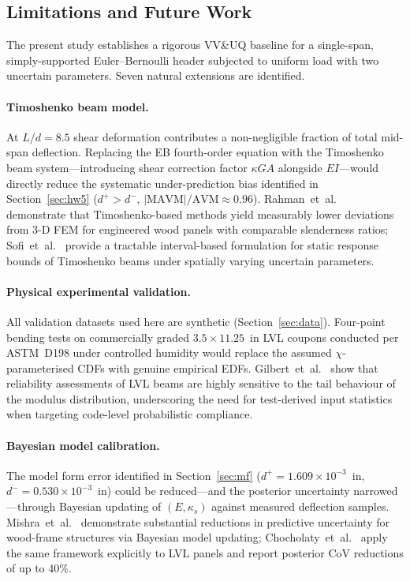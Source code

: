 \documentclass[10pt,twocolumn]{article}
\begin{document}
\subsection{Limitations and Future Work}
\label{sec:future}

The present study establishes a rigorous VV\&UQ baseline for a
single-span, simply-supported Euler--Bernoulli header subjected to
uniform load with two uncertain parameters.
Seven natural extensions are identified.

\paragraph{Timoshenko beam model.}
At $L/d = 8.5$ shear deformation contributes a non-negligible fraction
of total mid-span deflection.
Replacing the EB fourth-order equation with the Timoshenko beam
system---introducing shear correction factor $\kappa GA$ alongside
$EI$---would directly reduce the systematic under-prediction bias
identified in Section~\ref{sec:hw5} ($d^+ > d^-$,
$|\mathrm{MAVM}|/\mathrm{AVM} \approx 0.96$).
Rahman~et~al.~\cite{rahman2020} demonstrate that Timoshenko-based
methods yield measurably lower deviations from 3-D FEM for engineered
wood panels with comparable slenderness ratios; Sofi~et~al.~\cite{sofi2015}
provide a tractable interval-based formulation for static response
bounds of Timoshenko beams under spatially varying uncertain parameters.

\paragraph{Physical experimental validation.}
All validation datasets used here are synthetic
(Section~\ref{sec:data}).
Four-point bending tests on commercially graded
$3.5 \times 11.25$~in LVL coupons conducted per ASTM~D198 under
controlled humidity would replace the assumed $\chi$-parameterised CDFs
with genuine empirical EDFs.
Gilbert~et~al.~\cite{gilbert2019} show that reliability assessments of
LVL beams are highly sensitive to the tail behaviour of the modulus
distribution, underscoring the need for test-derived input statistics
when targeting code-level probabilistic compliance.

\paragraph{Bayesian model calibration.}
The model form error identified in Section~\ref{sec:mf}
($d^+ = 1.609\times10^{-3}$~in, $d^- = 0.530\times10^{-3}$~in)
could be reduced---and the posterior uncertainty narrowed---through
Bayesian updating of $(E, \kappa_s)$ against measured deflection
samples.
Mishra~et~al.~\cite{mishra2017} demonstrate substantial reductions in
predictive uncertainty for wood-frame structures via Bayesian model
updating; Chocholaty~et~al.~\cite{chocholaty2023} apply the same
framework explicitly to LVL panels and report posterior CoV
reductions of up to 40\%.
\end{document}
